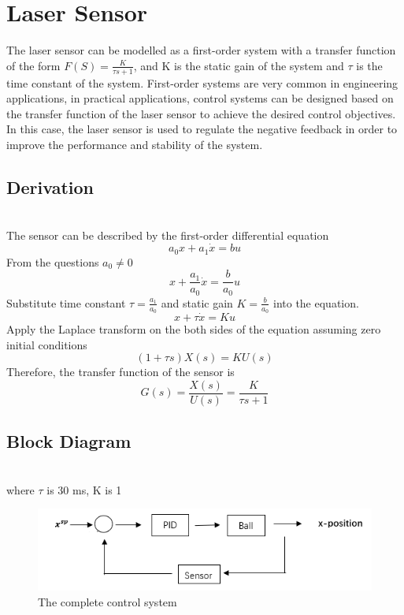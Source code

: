 \section{Laser Sensor}
The laser sensor can be modelled as a first-order system with a transfer function of the form $F(S)=\frac{K}{{\tau}s+1}$, and K is the static gain of the system and $\tau$ is the time constant of the system. First-order systems are very common in engineering applications, in practical applications, control systems can be designed based on the transfer function of the laser sensor to achieve the desired control objectives. In this case, the laser sensor is used to regulate the negative feedback in order to improve the performance and stability of the system.
\subsection*{Derivation} \hfill \\
\noindent The sensor can be described by the first-order differential equation 
\begin{equation}
a_{\text{0}}x+a_{\text{1}}\dot{x}=bu
\end{equation}
\noindent From the questions $a_{\text{0}}\neq0$
\begin{equation}
x+\frac{a_{\text{1}}}{a_{\text{0}}}\dot{x}=\frac{b}{a_{\text{0}}}u
\end{equation}
\noindent Substitute time constant $\tau=\frac{a_{\text{1}}}{a_{\text{0}}}$ and static gain $K=\frac{b}{a_{\text{0}}}$ into the equation.
\begin{equation}
x+\tau\dot{x}=Ku
\end{equation}
\noindent Apply the Laplace transform on the both sides of the equation assuming zero initial conditions
\begin{equation}
(1+{\tau}s)X(s)=KU(s)
\end{equation}
\noindent Therefore, the transfer function of the sensor is
\begin{equation}
G(s)=\frac{X(s)}{U(s)}=\frac{K}{{\tau}s+1}
\end{equation}
\subsection*{Block Diagram} \hfill \\
where $\tau$ is 30 ms, K is 1
\begin{figure}[ht]
    \centering
    \begin{minipage}{0.49\textwidth}
        \centering
        \includegraphics[width=1.0\linewidth]{Laser Sensor/All Control System.png}
        \caption{The complete control system }
    \end{minipage}
\end{figure}